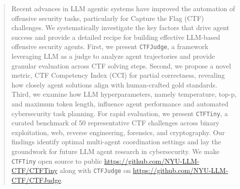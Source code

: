 \begin{abstract}
Recent advances in LLM agentic systems have  improved the automation of offensive security tasks, particularly for Capture the Flag (CTF) challenges. We systematically investigate the key factors that drive agent success and provide a detailed recipe for building effective LLM-based offensive security agents. First, we present \texttt{CTFJudge}, a framework leveraging LLM as a judge to analyze agent trajectories and provide granular evaluation across CTF solving steps. Second, we propose a novel metric, CTF Competency Index (CCI) for partial correctness, revealing how closely agent solutions align with human-crafted gold standards. Third, we examine how LLM hyperparameters, namely temperature, top-p, and maximum token length, influence agent performance and automated cybersecurity task planning. For rapid evaluation, we present \texttt{CTFTiny}, a curated benchmark of 50 representative CTF challenges across binary exploitation, web, reverse engineering, forensics, and cryptography. %
Our findings identify optimal multi-agent coordination settings and lay the groundwork for future LLM agent research in cybersecurity. We make \texttt{CTFTiny} open source to public \url{https://github.com/NYU-LLM-CTF/CTFTiny} along with \texttt{CTFJudge} on \url{https://github.com/NYU-LLM-CTF/CTFJudge}.
\end{abstract}